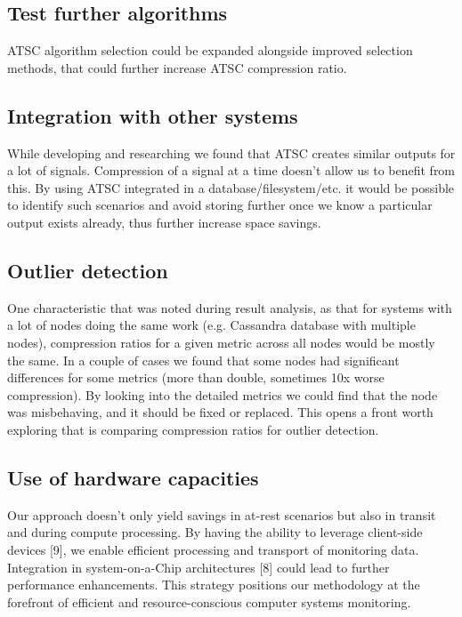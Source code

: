 \documentclass[conference]{IEEEtran}
\begin{document}
\subsection*{Test further algorithms}

ATSC algorithm selection could be expanded alongside improved selection methods, that could further increase ATSC compression ratio.

\subsection{Integration with other systems}

While developing and researching we found that ATSC creates similar outputs for a lot of signals. Compression of a signal at a time doesn't allow us to benefit from this. By using ATSC integrated in a database/filesystem/etc. it would be possible
to identify such scenarios and avoid storing further once we know a particular output exists already, thus further increase space savings.

\subsection{Outlier detection}

One characteristic that was noted during result analysis, as that for systems with a lot of nodes doing the same work (e.g. Cassandra database with multiple nodes), compression ratios for a given metric across all nodes would be mostly the same.
In a couple of cases we found that some nodes had significant differences for some metrics (more than double, sometimes 10x worse compression). By looking into the detailed metrics we could find that the node was misbehaving, and it should be fixed 
or replaced. This opens a front worth exploring that is comparing compression ratios for outlier detection.

\subsection{Use of hardware capacities}

Our approach doesn't only yield savings in at-rest scenarios but also in transit and during compute processing.
By having the ability to leverage client-side devices [9], we enable efficient processing and transport of monitoring data. 
Integration in system-on-a-Chip architectures [8] could lead to further performance enhancements. 
This strategy positions our methodology at the forefront of efficient and resource-conscious computer systems monitoring.
\end{document}
